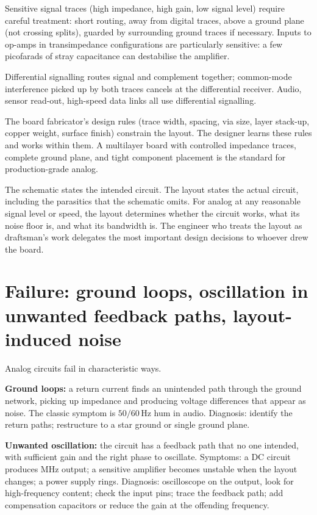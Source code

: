 Sensitive signal traces (high impedance, high gain, low signal level) require careful treatment: short routing, away from digital traces, above a ground plane (not crossing splits), guarded by surrounding ground traces if necessary. Inputs to op-amps in transimpedance configurations are particularly sensitive: a few picofarads of stray capacitance can destabilise the amplifier.

Differential signalling routes signal and complement together; common-mode interference picked up by both traces cancels at the differential receiver. Audio, sensor read-out, high-speed data links all use differential signalling.

The board fabricator's design rules (trace width, spacing, via size, layer stack-up, copper weight, surface finish) constrain the layout. The designer learns these rules and works within them. A multilayer board with controlled impedance traces, complete ground plane, and tight component placement is the standard for production-grade analog.

\begin{principle}
The schematic states the intended circuit. The layout states the actual circuit, including the parasitics that the schematic omits. For analog at any reasonable signal level or speed, the layout determines whether the circuit works, what its noise floor is, and what its bandwidth is. The engineer who treats the layout as draftsman's work delegates the most important design decisions to whoever drew the board.
\end{principle}

\section{Failure: ground loops, oscillation in unwanted feedback paths, layout-induced noise}

Analog circuits fail in characteristic ways.

\textbf{Ground loops:} a return current finds an unintended path through the ground network, picking up impedance and producing voltage differences that appear as noise. The classic symptom is $50/60\,\text{Hz}$ hum in audio. Diagnosis: identify the return paths; restructure to a star ground or single ground plane.

\textbf{Unwanted oscillation:} the circuit has a feedback path that no one intended, with sufficient gain and the right phase to oscillate. Symptoms: a DC circuit produces $\text{MHz}$ output; a sensitive amplifier becomes unstable when the layout changes; a power supply rings. Diagnosis: oscilloscope on the output, look for high-frequency content; check the input pins; trace the feedback path; add compensation capacitors or reduce the gain at the offending frequency.

